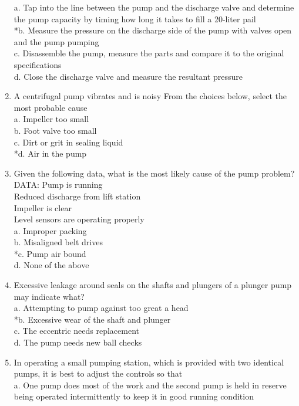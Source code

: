 \begin{enumerate}[1.]
a. Tap into the line between the pump and the discharge valve and determine the pump capacity by timing how long it takes to fill a 20-liter pail\\
*b. Measure the pressure on the discharge side of the pump with valves open and the pump pumping\\
c. Disassemble the pump, measure the parts and compare it to the original specifications\\
d. Close the discharge valve and measure the resultant pressure\\
\item A centrifugal pump vibrates and is noisy From the choices below, select the most probable cause\\
a. Impeller too small\\
b. Foot valve too small\\
c. Dirt or grit in sealing liquid\\
*d. Air in the pump\\
\item Given the following data, what is the most likely cause of the pump problem?\\
DATA: Pump is running\\
Reduced discharge from lift station\\
Impeller is clear\\
Level sensors are operating properly\\
a. Improper packing\\
b. Misaligned belt drives\\
*c. Pump air bound\\
d. None of the above\\
\item Excessive leakage around seals on the shafts and plungers of a plunger pump may indicate what?\\
a. Attempting to pump against too great a head\\
*b. Excessive wear of the shaft and plunger\\
c. The eccentric needs replacement\\
d. The pump needs new ball checks\\
\item In operating a small pumping station, which is provided with two identical pumps, it is best to adjust the controls so that\\
a. One pump does most of the work and the second pump is held in reserve being operated intermittently to keep it in good running condition\\

\end{enumerate}
